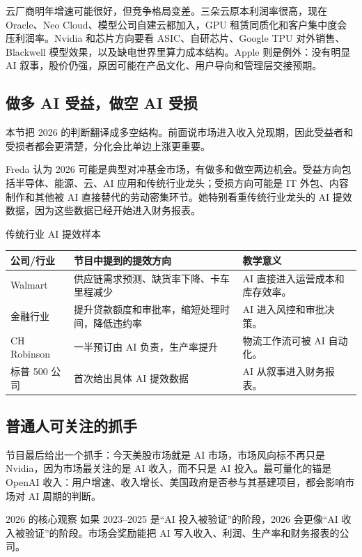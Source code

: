 \documentclass[a4paper]{article}
\begin{document}
云厂商明年增速可能很好，但竞争格局变差。三朵云原本利润率很高，现在 Oracle、Neo Cloud、模型公司自建云都加入，GPU 租赁同质化和客户集中度会压利润率。Nvidia 和芯片方向要看 ASIC、自研芯片、Google TPU 对外销售、Blackwell 模型效果，以及缺电世界里算力成本结构。Apple 则是例外：没有明显 AI 叙事，股价仍强，原因可能在产品文化、用户导向和管理层交接预期。

\subsection{做多 AI 受益，做空 AI 受损}

本节把 2026 的判断翻译成多空结构。前面说市场进入收入兑现期，因此受益者和受损者都会更清楚，分化会比单边上涨更重要。

Freda 认为 2026 可能是典型对冲基金市场，有做多和做空两边机会。受益方向包括半导体、能源、云、AI 应用和传统行业龙头；受损方向可能是 IT 外包、内容制作和其他被 AI 直接替代的劳动密集环节。她特别看重传统行业龙头的 AI 提效数据，因为这些数据已经开始进入财务报表。

\begin{knowledgebox}{传统行业 AI 提效样本}
\begin{tabularx}{\textwidth}{p{}p{}X}
\toprule
公司/行业 & 节目中提到的提效方向 & 教学意义 \\
\midrule
Walmart & 供应链需求预测、缺货率下降、卡车里程减少 & AI 直接进入运营成本和库存效率。 \\
金融行业 & 提升贷款额度和审批率，缩短处理时间，降低违约率 & AI 进入风控和审批决策。 \\
CH Robinson & 一半预订由 AI 负责，生产率提升 & 物流工作流可被 AI 自动化。 \\
标普 500 公司 & 首次给出具体 AI 提效数据 & AI 从叙事进入财务报表。 \\
\bottomrule
\end{tabularx}
\end{knowledgebox}

\subsection{普通人可关注的抓手}

节目最后给出一个抓手：今天美股市场就是 AI 市场，市场风向标不再只是 Nvidia，因为市场最关注的是 AI 收入，而不只是 AI 投入。最可量化的锚是 OpenAI 收入：用户增速、收入增长、美国政府是否参与其基建项目，都会影响市场对 AI 周期的判断。

\begin{importantbox}{2026 的核心观察}
如果 2023--2025 是“AI 投入被验证”的阶段，2026 会更像“AI 收入被验证”的阶段。市场会奖励能把 AI 写入收入、利润、生产率和财务报表的公司。
\end{importantbox}
\end{document}
